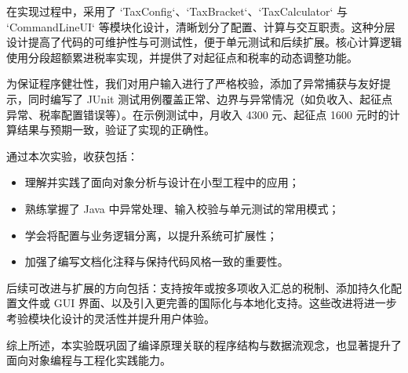 在实现过程中，采用了 `TaxConfig`、`TaxBracket`、`TaxCalculator` 与 `CommandLineUI` 等模块化设计，清晰划分了配置、计算与交互职责。这种分层设计提高了代码的可维护性与可测试性，便于单元测试和后续扩展。核心计算逻辑使用分段超额累进税率实现，并提供了对起征点和税率的动态调整功能。

为保证程序健壮性，我们对用户输入进行了严格校验，添加了异常捕获与友好提示，同时编写了 JUnit 测试用例覆盖正常、边界与异常情况（如负收入、起征点异常、税率配置错误等）。在示例测试中，月收入 4300 元、起征点 1600 元时的计算结果与预期一致，验证了实现的正确性。

通过本次实验，收获包括：
\begin{itemize}
	\item 理解并实践了面向对象分析与设计在小型工程中的应用；
	\item 熟练掌握了 Java 中异常处理、输入校验与单元测试的常用模式；
	\item 学会将配置与业务逻辑分离，以提升系统可扩展性；
	\item 加强了编写文档化注释与保持代码风格一致的重要性。
\end{itemize}

后续可改进与扩展的方向包括：支持按年或按多项收入汇总的税制、添加持久化配置文件或 GUI 界面、以及引入更完善的国际化与本地化支持。这些改进将进一步考验模块化设计的灵活性并提升用户体验。

综上所述，本实验既巩固了编译原理关联的程序结构与数据流观念，也显著提升了面向对象编程与工程化实践能力。
